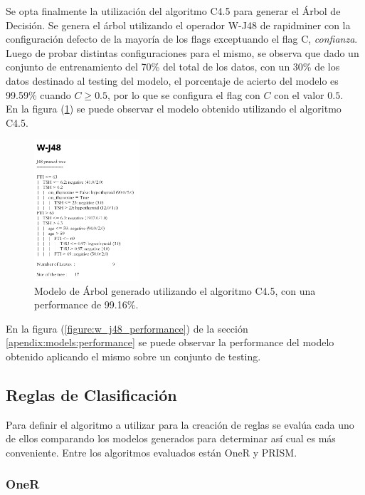 \documentclass[osajnl,twocolumn,showpacs,superscriptaddress,10pt,floatfix]{revtex4-1} %
\begin{document}
Se opta finalmente la utilización del algoritmo C4.5 para generar el Árbol de Decisión. Se genera el árbol utilizando el operador W-J48 de rapidminer con la configuración defecto de la mayoría de los flags exceptuando el flag C, \textit{confianza}. Luego de probar distintas configuraciones para el mismo, se observa que dado un conjunto de entrenamiento del 70\% del total de los datos, con un 30\% de los datos destinado al testing del modelo, el porcentaje de acierto del modelo es 99.59\% cuando $C \geq 0.5$, por lo que se configura el flag con $C$ con el valor $0.5$. \\

En la figura (\ref{figure:w_j48}) se puede observar el modelo obtenido utilizando el algoritmo C4.5.

\begin{figure}[H]
    \centering
    \includegraphics[width=0.35\textwidth]{models/w_j48}
    \caption{Modelo de Árbol generado utilizando el algoritmo C4.5, con una performance de 99.16\%.}
    \label{figure:w_j48}
\end{figure}

En la figura (\ref{figure:w_j48_performance}) de la sección \ref{apendix:models:performance} se puede observar la performance del modelo obtenido aplicando el mismo sobre un conjunto de testing. \\

\subsection{Reglas de Clasificación}

Para definir el algoritmo a utilizar para la creación de reglas se evalúa cada uno de ellos comparando los modelos generados para determinar así cual es más conveniente. Entre los algoritmos evaluados están OneR y PRISM. \\

\subsubsection{OneR}
\end{document}
